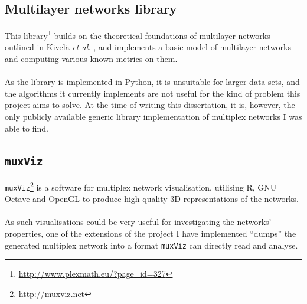 \documentclass[12pt,a4paper,twoside,openright]{report}
\begin{document}
\subsection{Multilayer networks library}\label{secnetlib}

This library\footnote{\url{http://www.plexmath.eu/?page_id=327}} builds on the theoretical foundations of multilayer networks outlined in Kivel{\"a} \emph{et al.}\! \cite{kivela2014multilayer}, and implements a basic model of multilayer networks and computing various known metrics on them.\\ \\
As the library is implemented in Python, it is unsuitable for larger data sets, and the algorithms it currently implements are not useful for the kind of problem this project aims to solve. At the time of writing this dissertation, it is, however, the only publicly available generic library implementation of multiplex networks I was able to find.

\subsection{{\tt muxViz}}\label{secmuxviz}

{\tt muxViz}\footnote{\url{http://muxviz.net}} \cite{de2014multilayer} is a software for multiplex network visualisation, utilising R, GNU Octave and OpenGL to produce high-quality 3D representations of the networks.\\ \\
As such visualisations could be very useful for investigating the networks' properties, one of the extensions of the project I have implemented ``dumps'' the generated multiplex network into a format {\tt muxViz} can directly read and analyse.
\end{document}
